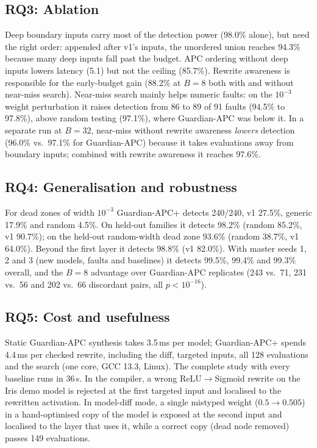 \documentclass[conference]{IEEEtran}
\begin{document}
\subsection{RQ3: Ablation}
Deep boundary inputs carry most of the detection power (98.0\% alone), but need the right order: appended after v1's inputs, the unordered union reaches 94.3\% because many deep inputs fall past the budget. APC ordering without deep inputs lowers latency (5.1) but not the ceiling (85.7\%). Rewrite awareness is responsible for the early-budget gain (88.2\% at $B=8$ both with and without near-miss search). Near-miss search mainly helps numeric faults: on the $10^{-3}$ weight perturbation it raises detection from 86 to 89 of 91 faults (94.5\% to 97.8\%), above random testing (97.1\%), where Guardian-APC was below it. In a separate run at $B=32$, near-miss without rewrite awareness \emph{lowers} detection (96.0\% vs.\ 97.1\% for Guardian-APC) because it takes evaluations away from boundary inputs; combined with rewrite awareness it reaches 97.6\%.

\subsection{RQ4: Generalisation and robustness}
For dead zones of width $10^{-3}$ Guardian-APC+ detects 240/240, v1 27.5\%, generic 17.9\% and random 4.5\%. On held-out families it detects 98.2\% (random 85.2\%, v1 90.7\%); on the held-out random-width dead zone 93.6\% (random 38.7\%, v1 64.0\%). Beyond the first layer it detects 98.8\% (v1 82.0\%). With master seeds 1, 2 and 3 (new models, faults and baselines) it detects 99.5\%, 99.4\% and 99.3\% overall, and the $B=8$ advantage over Guardian-APC replicates (243 vs.\ 71, 231 vs.\ 56 and 202 vs.\ 66 discordant pairs, all $p<10^{-16}$).

\subsection{RQ5: Cost and usefulness}
Static Guardian-APC synthesis takes 3.5\,ms per model; Guardian-APC+ spends 4.4\,ms per checked rewrite, including the diff, targeted inputs, all 128 evaluations and the search (one core, GCC 13.3, Linux). The complete study with every baseline runs in 36\,s. In the compiler, a wrong ReLU$\to$Sigmoid rewrite on the Iris demo model is rejected at the first targeted input and localised to the rewritten activation. In model-diff mode, a single mistyped weight ($0.5\to0.505$) in a hand-optimised copy of the model is exposed at the second input and localised to the layer that uses it, while a correct copy (dead node removed) passes 149 evaluations.
\end{document}
